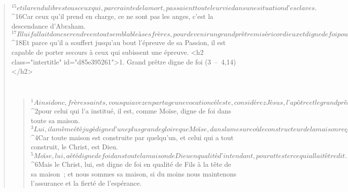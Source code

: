 \begin{verse}
${}^{15}et il a rendu libres tous ceux qui, par crainte de la mort, passaient toute leur vie dans une situation d’esclaves. 
${}^{16}Car ceux qu’il prend en charge, ce ne sont pas les anges, c’est la descendance d’Abraham. 
${}^{17}Il lui fallait donc se rendre en tout semblable à ses frères, pour devenir un grand prêtre miséricordieux et digne de foi pour les relations avec Dieu, afin d’enlever les péchés du peuple. 
${}^{18}Et parce qu’il a souffert jusqu’au bout l’épreuve de sa Passion, il est capable de porter secours à ceux qui subissent une épreuve.
      <h2 class="intertitle" id="d85e395261">1. Grand prêtre digne de foi (3 – 4,14)</h2>
      
         
      \bchapter{}
      \begin{verse}
${}^{1}Ainsi donc, frères saints, vous qui avez en partage une vocation céleste, considérez Jésus, l’apôtre et le grand prêtre de notre confession de foi : 
${}^{2}pour celui qui l’a institué, il est, comme Moïse, digne de foi dans toute sa maison. 
${}^{3}Lui, il a même été jugé digne d’une plus grande gloire que Moïse, dans la mesure où le constructeur de la maison reçoit plus d’honneur que la maison elle-même. 
${}^{4}Car toute maison est construite par quelqu’un, et celui qui a tout construit, le Christ, est Dieu. 
${}^{5}Moïse, lui, a été digne de foi dans toute la maison de Dieu en qualité d’intendant, pour attester ce qui allait être dit. 
${}^{6}Mais le Christ, lui, est digne de foi en qualité de Fils à la tête de sa maison ; et nous sommes sa maison, si du moins nous maintenons l’assurance et la fierté de l’espérance.
      

\end{verse}
\end{verse}
